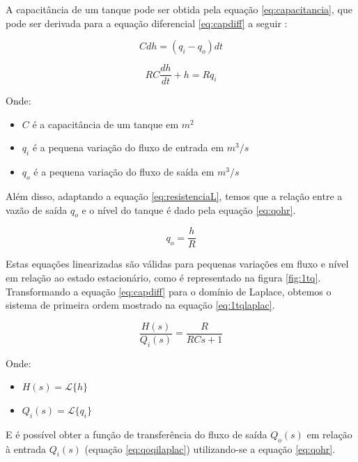 \documentclass[a4paper,11pt]{article}
\begin{document}
A capacitância de um tanque pode ser obtida pela equação \ref{eq:capacitancia}, que pode ser derivada para a equação diferencial \ref{eq:capdiff} a seguir \cite{ogatadinamico}:

\begin{equation}
    C dh = (q_i - q_o) dt
    \label{eq:capacitancia}
\end{equation}

\begin{equation}
    RC \frac{dh}{dt} + h = R q_i
    \label{eq:capdiff}
\end{equation}

Onde:

\begin{itemize}
    \item $C$ é a capacitância de um tanque em $m^2$
    \item $q_i$ é a pequena variação do fluxo de entrada em $m^3/s$
    \item $q_o$ é a pequena variação do fluxo de saída em $m^3/s$
\end{itemize}

Além disso, adaptando a equação \ref{eq:resistenciaL}, temos que a relação entre a vazão de saída $q_o$ e o nível do tanque é dado pela equação \ref{eq:qohr}.
    
    \begin{equation}
        q_o = \frac{h}{R}
        \label{eq:qohr}
    \end{equation}
    
    Estas equações linearizadas são válidas para pequenas variações em fluxo e nível em relação ao estado estacionário, como é representado na figura \ref{fig:1tq}. Transformando a equação \ref{eq:capdiff} para o domínio de Laplace, obtemos o sistema de primeira ordem mostrado na equação \ref{eq:1tqlaplac}.
    
    \begin{equation}
        \frac{H(s)}{Q_i(s)} = \frac{R}{RCs+1}
        \label{eq:1tqlaplac}
    \end{equation}

Onde:

\begin{itemize}
    \item $H(s) = \mathcal{L}\{h\}$
    \item $Q_i(s) = \mathcal{L}\{q_i\}$
\end{itemize}

E é possível obter a função de transferência do fluxo de saída $Q_o(s)$ em relação à entrada $Q_i(s)$ (equação \ref{eq:qoqilaplac}) utilizando-se a equação \ref{eq:qohr}.
\end{document}
